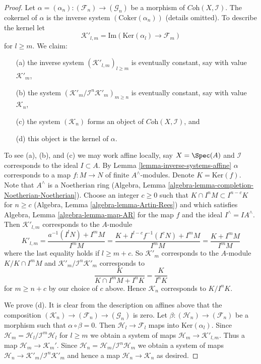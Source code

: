 \begin{proof}
Let $\alpha =(\alpha_n) : (\mathcal{F}_n) \to (\mathcal{G}_n)$ be a morphism of
$\textit{Coh}(X, \mathcal{I})$. The cokernel of $\alpha$ is the inverse system
$(\text{Coker}(\alpha_n))$ (details omitted). To describe the kernel let
$$
\mathcal{K}'_{l, m} = \text{Im}(\text{Ker}(\alpha_l) \to \mathcal{F}_m)
$$
for $l \geq m$.
We claim:
\begin{enumerate}
\item[(a)] the inverse system $(\mathcal{K}'_{l, m})_{l \geq m}$ is
eventually constant, say with value $\mathcal{K}'_m$,
\item[(b)] the system $(\mathcal{K}'_m/\mathcal{I}^n\mathcal{K}'_m)_{m \geq n}$
is eventually constant, say with value $\mathcal{K}_n$,
\item[(c)] the system $(\mathcal{K}_n)$ forms an object of
$\textit{Coh}(X, \mathcal{I})$, and
\item[(d)] this object is the kernel of $\alpha$.
\end{enumerate}
To see (a), (b), and (c) we may work affine locally, say $X = \Spec(A)$
and $\mathcal{I}$ corresponds to the ideal $I \subset A$. By
Lemma \ref{lemma-inverse-systems-affine}
$\alpha$ corresponds to a map $f : M \to N$ of finite $A^\wedge$-modules.
Denote $K = \text{Ker}(f)$. Note that $A^\wedge$ is a Noetherian
ring (Algebra, Lemma \ref{algebra-lemma-completion-Noetherian-Noetherian}).
Choose an integer $c \geq 0$ such that
$K \cap I^n M \subset I^{n - c}K$ for $n \geq c$
(Algebra, Lemma \ref{algebra-lemma-Artin-Rees})
and which satisfies Algebra, Lemma \ref{algebra-lemma-map-AR}
for the map $f$ and the ideal $I^\wedge = IA^\wedge$. Then
$\mathcal{K}'_{l, m}$ corresponds to the $A$-module
$$
K'_{l, m} = \frac{a^{-1}(I^lN) + I^mM}{I^mM} =
\frac{K + I^{l - c}f^{-1}(I^cN) + I^mM}{I^mM} =
\frac{K + I^mM}{I^mM}
$$
where the last equality holds if $l \geq m + c$. So $\mathcal{K}'_m$
corresponds to the $A$-module $K/K \cap I^mM$ and
$\mathcal{K}'_m/\mathcal{I}^n\mathcal{K}'_m$ corresponds to
$$
\frac{K}{K \cap I^mM + I^nK} = \frac{K}{I^nK}
$$
for $m \geq n + c$ by our choice of $c$ above. Hence $\mathcal{K}_n$
corresponds to $K/I^nK$.

\medskip\noindent
We prove (d). It is clear from the description on affines above that
the composition $(\mathcal{K}_n) \to (\mathcal{F}_n) \to (\mathcal{G}_n)$
is zero. Let $\beta : (\mathcal{H}_n) \to (\mathcal{F}_n)$
be a morphism such that $\alpha \circ \beta = 0$. Then
$\mathcal{H}_l \to \mathcal{F}_l$ maps into $\text{Ker}(\alpha_l)$.
Since $\mathcal{H}_m = \mathcal{H}_l/\mathcal{I}^m\mathcal{H}_l$
for $l \geq m$ we obtain a system of maps
$\mathcal{H}_m \to \mathcal{K}'_{l, m}$. Thus a map
$\mathcal{H}_m \to \mathcal{K}_m'$. Since
$\mathcal{H}_n = \mathcal{H}_m/\mathcal{I}^n\mathcal{H}_m$ we obtain
a system of maps $\mathcal{H}_n \to \mathcal{K}'_m/\mathcal{I}^n\mathcal{K}'_m$
and hence a map $\mathcal{H}_n \to \mathcal{K}_n$ as desired.


\end{proof}
